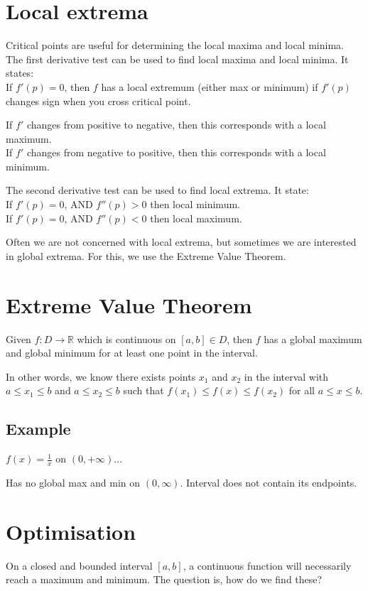 \section{Local extrema}
Critical points are useful for determining the local maxima and local minima.
The first derivative test can be used to find local maxima and local minima. It
states: \\
If $f'(p) = 0$, then $f$ has a local extremum (either max or minimum) if $f'(p)$
changes sign when you cross critical point.

If $f'$ changes from positive to negative, then this corresponds with a local
maximum. \\
If $f'$ changes from negative to positive, then this corresponds with a local
minimum.

The second derivative test can be used to find local extrema. It state: \\
If $f'(p) = 0$, AND $f''(p) > 0$ then local minimum. \\
If $f'(p) = 0$, AND $f''(p) < 0$ then local maximum.

Often we are not concerned with local extrema, but sometimes we are interested
in global extrema. For this, we use the Extreme Value Theorem.

\section{Extreme Value Theorem}
Given $f: D \to \mathbb{R}$ which is continuous on $[a,b] \in D$, then $f$ has a
global maximum and global minimum for at least one point in the interval.

In other words, we know there exists points $x_1$ and $x_2$ in the interval with
$a \leq x_1 \leq b$ and $a \leq x_2 \leq b$ such that
$f(x_1) \leq f(x) \leq f(x_2)$ for all $a \leq x \leq b$.

\subsection{Example}
$f(x) = \frac{1}{x}$ on $(0, +\infty)$...


Has no global max and min on $(0, \infty)$. Interval does not contain its
endpoints.

\section{Optimisation}
On a closed and bounded interval $[a,b]$, a continuous function will necessarily
reach a maximum and minimum. The question is, how do we find these?

